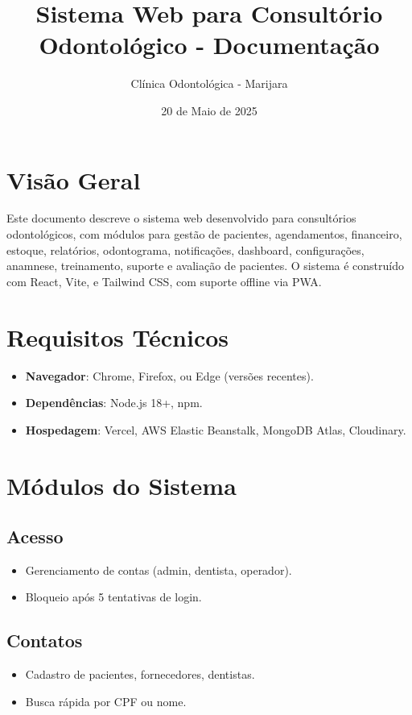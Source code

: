 \documentclass[a4paper,12pt]{article}
\begin{document}
\title{\textbf{Sistema Web para Consultório Odontológico - Documentação}}
\author{Clínica Odontológica - Marijara}
\date{20 de Maio de 2025}
\maketitle

\section{Visão Geral}
Este documento descreve o sistema web desenvolvido para consultórios odontológicos, com módulos para gestão de pacientes, agendamentos, financeiro, estoque, relatórios, odontograma, notificações, dashboard, configurações, anamnese, treinamento, suporte e avaliação de pacientes. O sistema é construído com React, Vite, e Tailwind CSS, com suporte offline via PWA.

\section{Requisitos Técnicos}
\begin{itemize}
    \item \textbf{Navegador}: Chrome, Firefox, ou Edge (versões recentes).
    \item \textbf{Dependências}: Node.js 18+, npm.
    \item \textbf{Hospedagem}: Vercel, AWS Elastic Beanstalk, MongoDB Atlas, Cloudinary.
\end{itemize}

\section{Módulos do Sistema}
\subsection{Acesso}
\begin{itemize}
    \item Gerenciamento de contas (admin, dentista, operador).
    \item Bloqueio após 5 tentativas de login.
\end{itemize}

\subsection{Contatos}
\begin{itemize}
    \item Cadastro de pacientes, fornecedores, dentistas.
    \item Busca rápida por CPF ou nome.
\end{itemize}
\end{document}
